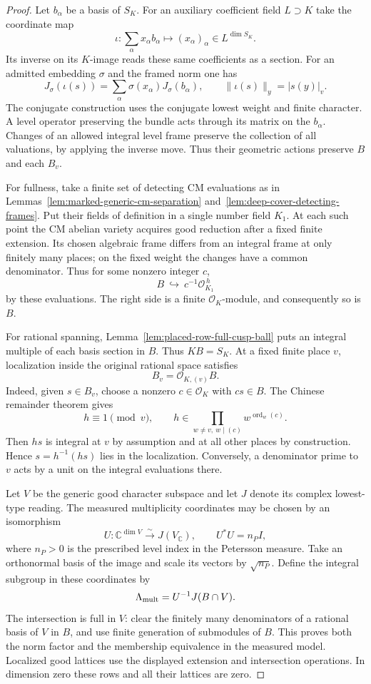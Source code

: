 \begin{proof}
Let \(b_\alpha\) be a basis of \(S_K\). For an auxiliary
coefficient field \(L\supset K\) take the coordinate map
\[
 \iota:\sum_\alpha x_\alpha b_\alpha\longmapsto
                  (x_\alpha)_\alpha\in L^{\dim S_K}.
\]
Its inverse on its \(K\)-image reads these same coefficients as a
section. For an admitted embedding \(\sigma\) and the framed
norm one has
\[
  J_\sigma(\iota(s))=\sum_\alpha\sigma(x_\alpha)J_\sigma(b_\alpha),
  \qquad \|\iota(s)\|_y=|s(y)|_v .
\]
The conjugate construction uses
the conjugate lowest weight and finite character. A level
operator preserving the bundle acts through its matrix on the
\(b_\alpha\). Changes of an allowed integral level frame preserve
the collection of all valuations, by applying the inverse move.
Thus their geometric actions preserve \(B\) and each \(B_v\).

For fullness, take a finite set of detecting CM evaluations as in
Lemmas~\ref{lem:marked-generic-cm-separation}
and~\ref{lem:deep-cover-detecting-frames}. Put their fields of
definition in a single number field \(K_1\). At each such point
the CM abelian variety acquires good reduction after a fixed
finite extension. Its chosen algebraic frame differs from an
integral frame at only finitely many places; on the fixed weight
the changes have a common denominator. Thus for some nonzero
integer \(c\),
\[
       B\ \hookrightarrow\ c^{-1}\mathcal O_{K_1}^{\,h}
\]
by these evaluations. The right side is a finite
\(\mathcal O_K\)-module, and consequently so is \(B\).

For rational spanning, Lemma~\ref{lem:placed-row-full-cusp-ball}
puts an integral multiple of each basis section in \(B\). Thus
\(KB=S_K\). At a fixed finite place \(v\), localization
inside the original rational space satisfies
\[
                     B_v=\mathcal O_{K,(v)} B .
\]
Indeed, given \(s\in B_v\), choose a nonzero \(c\in\mathcal O_K\)
with \(cs\in B\). The Chinese remainder theorem gives
\[
 h\equiv1\pmod v,\qquad
 h\in\prod_{w\ne v,\ w\mid(c)}w^{\operatorname{ord}_w(c)} .
\]
Then \(hs\) is integral at \(v\) by assumption and at all other
places by construction. Hence \(s=h^{-1}(hs)\) lies in the
localization. Conversely, a denominator prime to \(v\) acts by a
unit on the integral evaluations there.

Let \(V\) be the generic good character subspace and let
\(J\) denote its complex lowest-type reading. The measured
multiplicity coordinates may be chosen by an isomorphism
\[
 U:\mathbb C^{\dim V}\overset{\sim}{\longrightarrow}J(V_{\mathbb C}),
       \qquad U^*U=n_P I ,
\]
where \(n_P>0\) is the prescribed level index in the Petersson
measure. Take an orthonormal basis of the image and scale its
vectors by \(\sqrt{n_P}\). Define the integral subgroup in these
coordinates by
\[
            \Lambda_{\rm mult}=U^{-1}J(B\cap V).
\]
The intersection is full in \(V\): clear the finitely many
denominators of a rational basis of \(V\) in \(B\), and use
finite generation of submodules of \(B\). This proves both
the norm factor and the membership equivalence in the measured
model. Localized good lattices use the displayed extension and
intersection operations. In dimension zero these rows and all their lattices are zero.
\end{proof}


